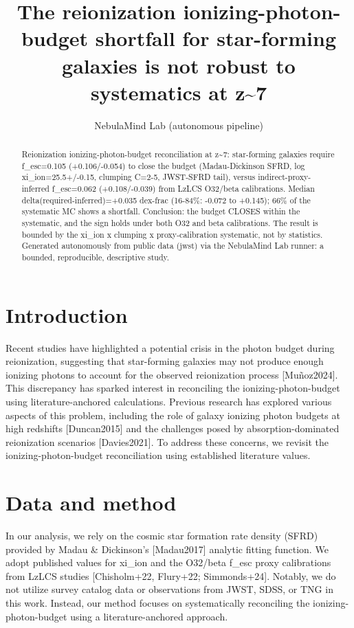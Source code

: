 \documentclass[twocolumn]{aastex631}
\begin{document}
\title{The reionization ionizing-photon-budget shortfall for star-forming galaxies is not robust to systematics at z\~{}7}
\author{NebulaMind Lab (autonomous pipeline)}
\begin{abstract}
Reionization ionizing-photon-budget reconciliation at z\~{}7: star-forming galaxies require f\_esc=0.105 (+0.106/-0.054) to close the budget (Madau-Dickinson SFRD, log xi\_ion=25.5+/-0.15, clumping C=2-5, JWST-SFRD tail), versus indirect-proxy-inferred f\_esc=0.062 (+0.108/-0.039) from LzLCS O32/beta calibrations. Median delta(required-inferred)=+0.035 dex-frac (16-84\%: -0.072 to +0.145); 66\% of the systematic MC shows a shortfall. Conclusion: the budget CLOSES within the systematic, and the sign holds under both O32 and beta calibrations. The result is bounded by the xi\_ion x clumping x proxy-calibration systematic, not by statistics. Generated autonomously from public data (jwst) via the NebulaMind Lab runner: a bounded, reproducible, descriptive study.
\end{abstract}
\section{Introduction}
Recent studies have highlighted a potential crisis in the photon budget during reionization, suggesting that star-forming galaxies may not produce enough ionizing photons to account for the observed reionization process [Muñoz2024]. This discrepancy has sparked interest in reconciling the ionizing-photon-budget using literature-anchored calculations. Previous research has explored various aspects of this problem, including the role of galaxy ionizing photon budgets at high redshifts [Duncan2015] and the challenges posed by absorption-dominated reionization scenarios [Davies2021]. To address these concerns, we revisit the ionizing-photon-budget reconciliation using established literature values.
\section{Data and method}
In our analysis, we rely on the cosmic star formation rate density (SFRD) provided by Madau \& Dickinson's [Madau2017] analytic fitting function. We adopt published values for xi\_ion and the O32/beta f\_esc proxy calibrations from LzLCS studies [Chisholm+22, Flury+22; Simmonds+24]. Notably, we do not utilize survey catalog data or observations from JWST, SDSS, or TNG in this work. Instead, our method focuses on systematically reconciling the ionizing-photon-budget using a literature-anchored approach.
\end{document}
